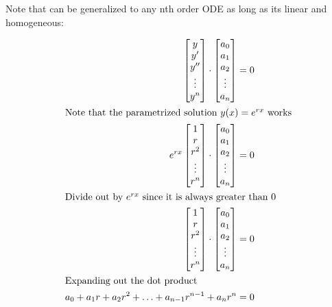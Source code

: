 \documentclass[../notes.tex]{subfiles}
\begin{document}
Note that  can be generalized to any nth order ODE as long as its linear and homogeneous:

\begin{align*}
				\begin{bmatrix} 
								y \\
								y' \\
								y'' \\
								\vdots \\
								y^{n}
				\end{bmatrix} \cdot 
				\begin{bmatrix} 
								a_0 \\
								a_1 \\
								a_2 \\
								\vdots \\
								a_n
				\end{bmatrix} &= 0 \\
				\intertext{Note that the parametrized solution $y(x) = e^{rx}$ works}
				e^{rx} \begin{bmatrix} 
								1 \\
								r \\
								r^2 \\
								\vdots \\
								r^{n}
				\end{bmatrix} \cdot
				\begin{bmatrix} 
								a_0 \\
								a_1 \\
								a_2 \\
								\vdots \\
								a_n
				\end{bmatrix} &= 0 \\
				\intertext{Divide out by $e^{rx}$ since it is always greater than 0}
				\begin{bmatrix} 
								1 \\
								r \\
								r^2 \\
								\vdots \\
								r^{n}
				\end{bmatrix} \cdot
				\begin{bmatrix} 
								a_0 \\
								a_1 \\
								a_2 \\
								\vdots \\
								a_n
				\end{bmatrix} &= 0 \\
				\intertext{Expanding out the dot product}
				a_0 + a_1 r + a_2 r^2 + \hdots + a_{n-1} r^{n-1} + a_n r^{n} &= 0
\end{align*}
\end{document}
